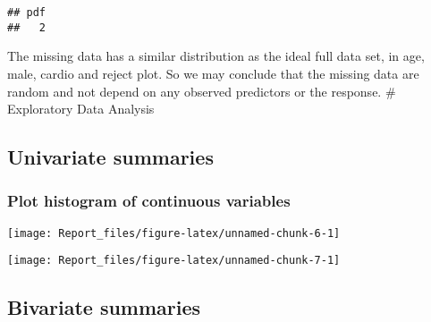\documentclass[
]{article}
\newenvironment{Shaded}{\begin{snugshade}}{\end{snugshade}}
\newcommand{\AttributeTok}[1]{\textcolor[rgb]{0.77,0.63,0.00}{#1}}
\newcommand{\FunctionTok}[1]{\textcolor[rgb]{0.00,0.00,0.00}{#1}}
\newcommand{\NormalTok}[1]{#1}
\newcommand{\SpecialCharTok}[1]{\textcolor[rgb]{0.00,0.00,0.00}{#1}}
\newcommand{\StringTok}[1]{\textcolor[rgb]{0.31,0.60,0.02}{#1}}
\begin{document}
\begin{verbatim}
## pdf 
##   2
\end{verbatim}

The missing data has a similar distribution as the ideal full data set,
in age, male, cardio and reject plot. So we may conclude that the
missing data are random and not depend on any observed predictors or the
response. \# Exploratory Data Analysis

\hypertarget{univariate-summaries}{%
\subsection{Univariate summaries}\label{univariate-summaries}}

\hypertarget{plot-histogram-of-continuous-variables}{%
\subsubsection{Plot histogram of continuous
variables}\label{plot-histogram-of-continuous-variables}}

\begin{Shaded}
\end{Shaded}

\begin{center}\texttt{[image: Report\_files/figure-latex/unnamed-chunk-6-1]} \end{center}

\begin{Shaded}
\end{Shaded}

\begin{center}\texttt{[image: Report\_files/figure-latex/unnamed-chunk-7-1]} \end{center}

\hypertarget{bivariate-summaries}{%
\subsection{Bivariate summaries}\label{bivariate-summaries}}
\end{document}
